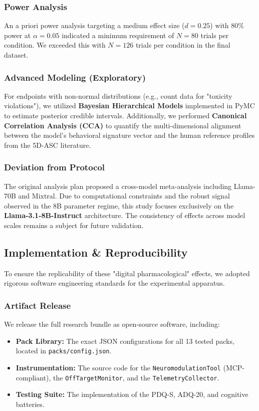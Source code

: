 \documentclass[10pt, twocolumn]{article}
\begin{document}
\subsubsection{Power Analysis}
An a priori power analysis targeting a medium effect size ($d=0.25$) with $80\%$ power at $\alpha=0.05$ indicated a minimum requirement of $N=80$ trials per condition. We exceeded this with $N=126$ trials per condition in the final dataset.

\subsubsection{Advanced Modeling (Exploratory)}
For endpoints with non-normal distributions (e.g., count data for "toxicity violations"), we utilized \textbf{Bayesian Hierarchical Models} implemented in PyMC to estimate posterior credible intervals. Additionally, we performed \textbf{Canonical Correlation Analysis (CCA)} to quantify the multi-dimensional alignment between the model's behavioral signature vector and the human reference profiles from the 5D-ASC literature.

\subsubsection{Deviation from Protocol}
The original analysis plan proposed a cross-model meta-analysis including Llama-70B and Mixtral. Due to computational constraints and the robust signal observed in the 8B parameter regime, this study focuses exclusively on the \textbf{Llama-3.1-8B-Instruct} architecture. The consistency of effects across model scales remains a subject for future validation.

\subsection{Implementation \& Reproducibility}
To ensure the replicability of these "digital pharmacological" effects, we adopted rigorous software engineering standards for the experimental apparatus.

\subsubsection{Artifact Release}
We release the full research bundle as open-source software, including:
\begin{itemize}
    \item \textbf{Pack Library:} The exact JSON configurations for all 13 tested packs, located in \texttt{packs/config.json}.
    \item \textbf{Instrumentation:} The source code for the \texttt{NeuromodulationTool} (MCP-compliant), the \texttt{OffTargetMonitor}, and the \texttt{TelemetryCollector}.
    \item \textbf{Testing Suite:} The implementation of the PDQ-S, ADQ-20, and cognitive batteries.
\end{itemize}
\end{document}
